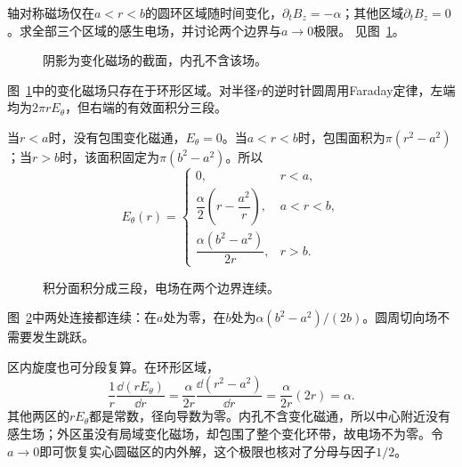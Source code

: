 \begin{exercise}[环形磁区与空心区域]\label{ex:i1-h2}
轴对称磁场仅在$a<r<b$的圆环区域随时间变化，$\partial_tB_z=-\alpha$；其他区域$\partial_tB_z=0$。求全部三个区域的感生电场，并讨论两个边界与$a\to0$极限。 见图~\ref{fig:i1-h2-q}。
\end{exercise}

\begin{figure}[H]\centering
{}
\caption{阴影为变化磁场的截面，内孔不含该场。}\label{fig:i1-h2-q}
\end{figure}
\begin{solution}
图~\ref{fig:i1-h2-q}中的变化磁场只存在于环形区域。对半径$r$的逆时针圆周用Faraday定律，左端均为$2\pi rE_\theta$，但右端的有效面积分三段。

当$r<a$时，没有包围变化磁通，$E_\theta=0$。当$a<r<b$时，包围面积为$\pi(r^2-a^2)$；当$r>b$时，该面积固定为$\pi(b^2-a^2)$。所以
\[\boxed{E_\theta(r)=\begin{cases}
0,&r<a,\\
\dfrac\alpha2\left(r-\dfrac{a^2}{r}\right),&a<r<b,\\
\dfrac{\alpha(b^2-a^2)}{2r},&r>b.
\end{cases}}
\]

\begin{figure}[H]\centering
{}
\caption{积分面积分成三段，电场在两个边界连续。}\label{fig:i1-h2-s}
\end{figure}

图~\ref{fig:i1-h2-s}中两处连接都连续：在$a$处为零，在$b$处为$\alpha(b^2-a^2)/(2b)$。圆周切向场不需要发生跳跃。

区内旋度也可分段复算。在环形区域，
\[\frac1r\frac{\dd(rE_\theta)}{\dd r}
=\frac\alpha{2r}\frac{\dd(r^2-a^2)}{\dd r}
=\frac\alpha{2r}(2r)=\alpha.\]
其他两区的$rE_\theta$都是常数，径向导数为零。内孔不含变化磁通，所以中心附近没有感生场；外区虽没有局域变化磁场，却包围了整个变化环带，故电场不为零。令$a\to0$即可恢复实心圆磁区的内外解，这个极限也核对了分母与因子$1/2$。
\end{solution}

